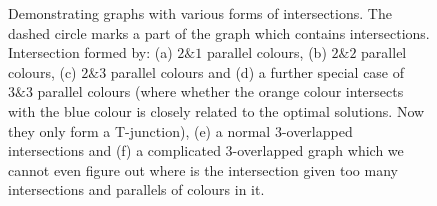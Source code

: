 \documentclass[journal]{IEEEtran}
\begin{document}
\begin{figure}[t]
\centering
\caption{Demonstrating graphs with various forms of intersections. 
The dashed circle marks a part of the graph which contains intersections. 
Intersection formed by: (a) $2\&1$ parallel colours, (b) $2\&2$ parallel colours, (c) $2\&3$ parallel colours and (d) a further special case of $3\&3$ parallel colours (where whether the orange colour intersects with the blue colour is closely related to the optimal solutions. Now they only form a T-junction), (e) a normal $3$-overlapped intersections and (f) a complicated $3$-overlapped graph which we cannot even figure out where is the intersection given too many intersections and parallels of colours in it. }\label{fig:three_overlapped_graph}
\end{figure}

\end{document}
